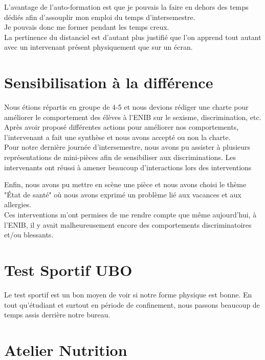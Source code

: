 {L'avantage de l'auto-formation est que je pouvais la faire en dehors des temps dédiés afin d'assouplir mon emploi du temps d'intersemestre. \\Je pouvais donc me former pendant les temps creux. \\

La pertinence du distanciel est d'autant plus justifié que l'on apprend tout autant avec un intervenant présent physiquement que sur un écran.


\section{Sensibilisation à la différence}

Nous étions répartis en groupe de 4-5 et nous devions rédiger une charte pour améliorer le comportement des élèves à l'ENIB sur le sexisme, discrimination, etc.\\

Après avoir proposé différentes actions pour améliorer nos comportements, l'intervenant a fait une synthèse et nous avons accepté ou non la charte.\\

Pour notre dernière journée d'intersemestre, nous avons pu assister à plusieurs représentations de mini-pièces afin de sensibiliser aux discriminations. Les intervenants ont réussi à amener beaucoup d'interactions lors des interventions

Enfin, nous avons pu mettre en scène une pièce et nous avons choisi le thème "État de santé" où nous avons exprimé un problème lié aux vacances et aux allergies.\\

Ces interventions m'ont permises de me rendre compte que même aujourd'hui, à l'ENIB, il y avait malheureusement encore des comportements discriminatoires et/ou blessants.


\section{Test Sportif UBO}

Le test sportif est un bon moyen de voir si notre forme physique est bonne. En tout qu'étudiant et surtout en période de confinement, nous passons beaucoup de temps assis derrière notre bureau.

\section{Atelier Nutrition}

}
